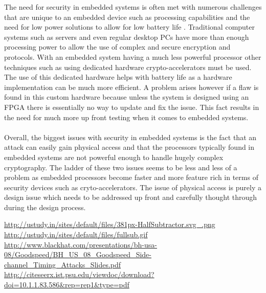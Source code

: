 \documentclass{article}
\begin{document}
The need for security in embedded systems is often met with numerous challenges that are unique to an embedded device such as processing capabilities and
the need for low power solutions to allow for low battery life \cite{sec}. Traditional computer systems such as servers and even regular desktop PCs have
more than enough processing power to allow the use of complex and secure encryption and protocols. With an embedded system having a much less powerful
processor other techniques such as using dedicated hardware crypto-accelerators must be used. The use of this dedicated hardware helps with battery
life as a hardware implementation can be much more efficient. A problem arises however if a flaw is found in this custom hardware because unless the 
system is designed using an FPGA there is essentially no way to update and fix the issue. This fact results in the need for much more up front testing
when it comes to embedded systems.
\\\\
Overall, the biggest issues with security in embedded systems is the fact that an attack can easily gain physical access and that the processors typically
found in embedded systems are not powerful enough to handle hugely complex cryptography. The ladder of these two issues seems to be less and less of 
a problem as embedded processors become faster and more feature rich in terms of security devices such as cryto-accelerators. The issue of physical access
is purely a design issue which needs to be addressed up front and carefully thought through during the design process.

\begin{thebibliography}{9}
    \url{http://ustudy.in/sites/default/files/381px-HalfSubtractor.svg_.png}
    \url{http://ustudy.in/sites/default/files/fullsub.gif}
    \url{http://www.blackhat.com/presentations/bh-usa-08/Goodspeed/BH_US_08_Goodspeed_Side-channel_Timing_Attacks_Slides.pdf}
    \url{http://citeseerx.ist.psu.edu/viewdoc/download?doi=10.1.1.83.586&rep=rep1&type=pdf}
\end{thebibliography}
\end{document}
